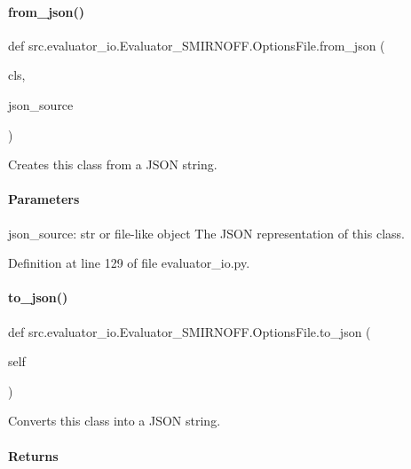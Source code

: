 \paragraph{\texorpdfstring{from\+\_\+json()}{from\_json()}}
{\footnotesize\ttfamily def src.\+evaluator\+\_\+io.\+Evaluator\+\_\+\+S\+M\+I\+R\+N\+O\+F\+F.\+Options\+File.\+from\+\_\+json (\begin{DoxyParamCaption}\item[{}]{cls,  }\item[{}]{json\+\_\+source }\end{DoxyParamCaption})}



Creates this class from a J\+S\+ON string. 

\paragraph*{Parameters }

json\+\_\+source\+: str or file-\/like object The J\+S\+ON representation of this class. 

Definition at line 129 of file evaluator\+\_\+io.\+py.

\mbox{\label{classsrc_1_1evaluator__io_1_1Evaluator__SMIRNOFF_1_1OptionsFile_abe5a6817f9456684926cba96c8b39040}} 
\paragraph{\texorpdfstring{to\+\_\+json()}{to\_json()}}
{\footnotesize\ttfamily def src.\+evaluator\+\_\+io.\+Evaluator\+\_\+\+S\+M\+I\+R\+N\+O\+F\+F.\+Options\+File.\+to\+\_\+json (\begin{DoxyParamCaption}\item[{}]{self }\end{DoxyParamCaption})}



Converts this class into a J\+S\+ON string. 

\paragraph*{Returns }

